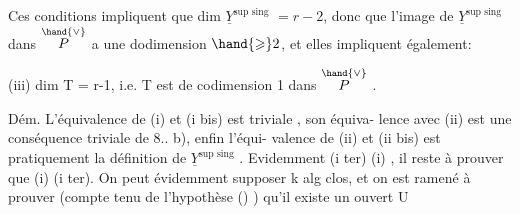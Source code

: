 Ces conditions impliquent que  dim $\underline{Y}^{\text{sup sing}}$ $= r-2$, donc que
l'image de $\underline{Y}^{\text{sup sing}}$ dans $\overset{\hand{\vee}}{P}$ a une dodimension $\hand{\geqslant} 2$, et  elles impliquent
également:

(iii) dim T = r-1, i.e. T est de codimension 1 dans $\overset{\hand{\vee}}{P}$ .

Dém. L'équivalence de (i) et (i bis) est triviale , son équiva-%
lence avec (ii) est une conséquence triviale de 8.. b), enfin l'équi-%
valence de (ii) et (ii bis) est pratiquement la définition de
$\underline{Y}^{\text{sup sing}}$ . Evidemment (i ter) \hand{$\Longrightarrow$}(i) , il reste à prouver que (i)\hand{$\Longrightarrow$}
(i ter). On peut évidemment supposer k alg clos, et on est ramené à
prouver (compte tenu de l'hypothèse () ) qu'il existe un ouvert U\hand{$\neq\emptyset$}

